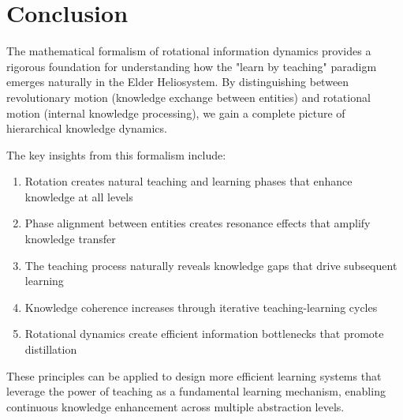 \section{Conclusion}

The mathematical formalism of rotational information dynamics provides a rigorous foundation for understanding how the "learn by teaching" paradigm emerges naturally in the Elder Heliosystem. By distinguishing between revolutionary motion (knowledge exchange between entities) and rotational motion (internal knowledge processing), we gain a complete picture of hierarchical knowledge dynamics.

The key insights from this formalism include:

\begin{enumerate}
    \item Rotation creates natural teaching and learning phases that enhance knowledge at all levels
    \item Phase alignment between entities creates resonance effects that amplify knowledge transfer
    \item The teaching process naturally reveals knowledge gaps that drive subsequent learning
    \item Knowledge coherence increases through iterative teaching-learning cycles
    \item Rotational dynamics create efficient information bottlenecks that promote distillation
\end{enumerate}

These principles can be applied to design more efficient learning systems that leverage the power of teaching as a fundamental learning mechanism, enabling continuous knowledge enhancement across multiple abstraction levels.